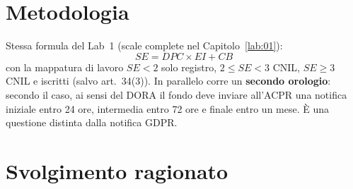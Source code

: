 \section{Metodologia}
Stessa formula del Lab~1 (scale complete nel Capitolo~\ref{lab:01}):
\[
SE = DPC \times EI + CB
\]
con la mappatura di lavoro $SE<2$ solo registro, $2 \le SE <3$ CNIL, $SE \ge 3$ CNIL e iscritti
(salvo art.~34(3)). In parallelo corre un \textbf{secondo orologio}: secondo il caso, ai sensi del
DORA il fondo deve inviare all'ACPR una notifica iniziale entro 24 ore, intermedia entro 72 ore e
finale entro un mese. È una questione distinta dalla notifica GDPR.

\section{Svolgimento ragionato}


